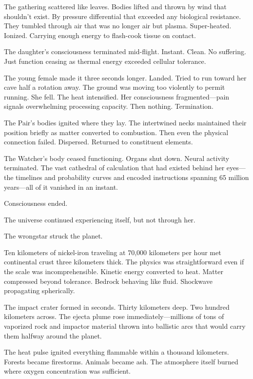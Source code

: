 The gathering scattered like leaves. Bodies lifted and thrown by wind that shouldn't exist. By pressure differential that exceeded any biological resistance. They tumbled through air that was no longer air but plasma. Super-heated. Ionized. Carrying enough energy to flash-cook tissue on contact.

The daughter's consciousness terminated mid-flight. Instant. Clean. No suffering. Just function ceasing as thermal energy exceeded cellular tolerance.

The young female made it three seconds longer. Landed. Tried to run toward her cave half a rotation away. The ground was moving too violently to permit running. She fell. The heat intensified. Her consciousness fragmented—pain signals overwhelming processing capacity. Then nothing. Termination.

The Pair's bodies ignited where they lay. The intertwined necks maintained their position briefly as matter converted to combustion. Then even the physical connection failed. Dispersed. Returned to constituent elements.

The Watcher's body ceased functioning. Organs shut down. Neural activity terminated. The vast cathedral of calculation that had existed behind her eyes—the timelines and probability curves and encoded instructions spanning 65 million years—all of it vanished in an instant.

Consciousness ended.

The universe continued experiencing itself, but not through her.

\scenebreak

The wrongstar struck the planet.

Ten kilometers of nickel-iron traveling at 70,000 kilometers per hour met continental crust three kilometers thick. The physics was straightforward even if the scale was incomprehensible. Kinetic energy converted to heat. Matter compressed beyond tolerance. Bedrock behaving like fluid. Shockwave propagating spherically.

The impact crater formed in seconds. Thirty kilometers deep. Two hundred kilometers across. The ejecta plume rose immediately—millions of tons of vaporized rock and impactor material thrown into ballistic arcs that would carry them halfway around the planet.

The heat pulse ignited everything flammable within a thousand kilometers. Forests became firestorms. Animals became ash. The atmosphere itself burned where oxygen concentration was sufficient.

